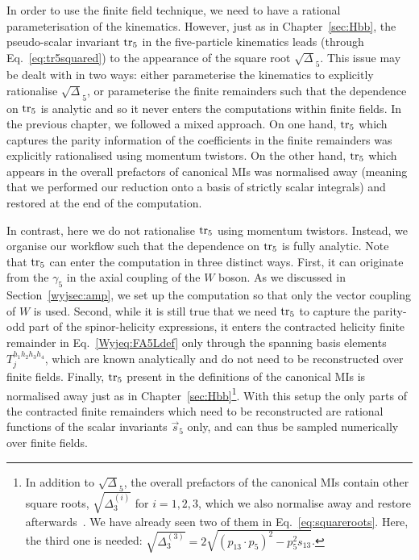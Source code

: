 \documentclass[main.tex]{subfiles}
\begin{document}
In order to use the finite field technique, we need to have a rational parameterisation of the kinematics. However, just as in Chapter~\ref{sec:Hbb}, the pseudo-scalar invariant $\operatorname{\rm tr}_5$ in the five-particle kinematics leads (through Eq.~\eqref{eq:tr5squared}) to the appearance of the square root $\sqrt{\Delta}_5$. This issue may be dealt with in two ways: either parameterise the kinematics to explicitly rationalise $\sqrt{\Delta}_5$, or parameterise the finite remainders such that the dependence on $\operatorname{\rm tr}_5$ is analytic and so it never enters the computations within finite fields. In the previous chapter, we followed a mixed approach. On one hand, $\operatorname{\rm tr}_5$ which captures the parity information of the coefficients in the finite remainders was explicitly rationalised using momentum twistors. On the other hand, $\operatorname{\rm tr}_5$ which appears in the overall prefactors of canonical MIs was normalised away (meaning that we performed our reduction onto a basis of strictly scalar integrals) and restored at the end of the computation.

In contrast, here we do not rationalise $\operatorname{\rm tr}_5$ using momentum twistors. Instead, we organise our workflow such that the dependence on $\operatorname{\rm tr}_5$ is fully analytic. Note that $\operatorname{\rm tr}_5$ can enter the computation in three distinct ways. First, it can originate from the $\gamma_5$ in the axial coupling of the $W$ boson. As we discussed in Section~\ref{wyjsec:amp}, we set up the computation so that only the vector coupling of $W$ is used. Second, while it is still true that we need $\operatorname{\rm tr}_5$ to capture the parity-odd part of the spinor-helicity expressions, it enters the contracted helicity finite remainder in Eq.~\eqref{Wyjeq:FA5Ldef} only through the spanning basis elements $T_{j}^{h_1 h_2 h_3 h_4}$, which are known analytically and do not need to be reconstructed over finite fields. Finally, $\operatorname{\rm tr}_5$ present in the definitions of the canonical MIs is normalised away just as in Chapter~\ref{sec:Hbb}\footnote{In addition to $\sqrt{\Delta}_5$, the overall prefactors of the canonical MIs contain other square roots, $\sqrt{\Delta_3^{(i)}}$ for $i=1,2,3$, which we also normalise away and restore afterwards~\cite{Abreu:2020jxa, Chicherin:2021dyp}. We have already seen two of them in Eq.~\ref{eq:squareroots}. Here, the third one is needed: $\sqrt{\Delta_3^{(3)}} = 2 \sqrt{(p_{13} \cdot p_{5})^2 - p_5^2 s_{13}}$.}. With this setup the only parts of the contracted finite remainders which need to be reconstructed are rational functions of the scalar invariants $\vec{s}_5$ only, and can thus be sampled numerically over finite fields.
\end{document}
